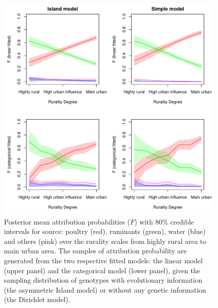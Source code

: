 \documentclass[times, doublespace]{simauth}%
\begin{document}
\begin{figure}
\centering
\includegraphics[width=.9\linewidth]{Figures/FCILandC(5)}
\caption{Posterior mean attribution probabilities ($F$) with 80\% credible intervals for source: poultry (red), ruminants (green), water (blue) and others (pink) over the rurality scales from highly rural area to main urban area. The samples of attribution probability are generated from the two respective fitted models: the linear model (upper panel) and the categorical model (lower panel), given the sampling distribution of genotypes with evolutionary information (the asymmetric Island model) or without any genetic information (the Dirichlet model).}
\label{fig2}
\end{figure}
\end{document}
